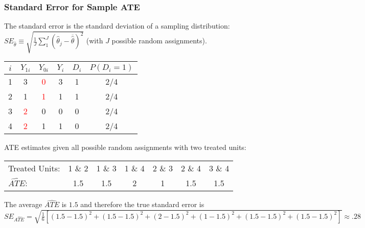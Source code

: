 \documentclass{beamer}
\numberwithin{equation}{section}
\begin{document}
\begin{frame}
  \frametitle{Standard Error for Sample ATE}
\small
The standard error is the standard deviation of a sampling distribution: $SE_{\widehat{\theta}}\equiv\sqrt{\frac{1}{J}\sum_1^J (\widehat{\theta}_j -\overline{\widehat{\theta}})^2}$ (with $J$ possible random assignments).\vspace{-.3in}
\begin{center}
\begin{tabular}{cccccc}
 \multicolumn{1}{p{2cm}}{\center $i$} &   \multicolumn{1}{p{1cm}}{\center $Y_{1i}$} & \multicolumn{1}{p{1cm}}{\center $Y_{0i}$}&    \multicolumn{1}{p{1cm}}{\center $Y_{i}$} &   \multicolumn{1}{p{1cm}}{\center $D_{i}$}   &   \multicolumn{1}{p{2cm}}{\center $P(D_{i}=1)$}   \\
\hline
\rowcolor{gray!10}        1 &          3 &        \textcolor{red}{0} &          3 &          1 & 2/4  \\
\rowcolor{gray!10}         2 &         1 &       \textcolor{red}{1} &          1 &          1  & 2/4 \\
\rowcolor{gray!30}         3 &          \textcolor{red}{2} &         0 &          0 &          0  & 2/4 \\
\rowcolor{gray!30}         4 &          \textcolor{red}{2} &         1 &          1 &          0 & 2/4  \\
\hline
\end{tabular}
\end{center}
ATE estimates given all possible random assignments with two treated units:\\
\begin{center}
\begin{tabular}{lcccccc}
\hline
\hline
    Treated Units: & 1 \& 2 & 1 \& 3 & 1 \& 4 & 2 \& 3 & 2 \& 4 & 3 \& 4 \\
   $\widehat{ATE}$: & 1.5 & 1.5 & 2  & 1  & 1.5 & 1.5 \\
\hline \hline
\end{tabular}
\end{center}
The average $\widehat{ATE}$ is $1.5$ and therefore the true standard error is
\tiny{$SE_{\widehat{ATE}}=\sqrt{\frac{1}{6}[(1.5-1.5)^2+(1.5-1.5)^2+(2-1.5)^2+(1-1.5)^2+(1.5-1.5)^2+(1.5-1.5)^2]}\approx.28$}\\
\end{frame}
\end{document}

